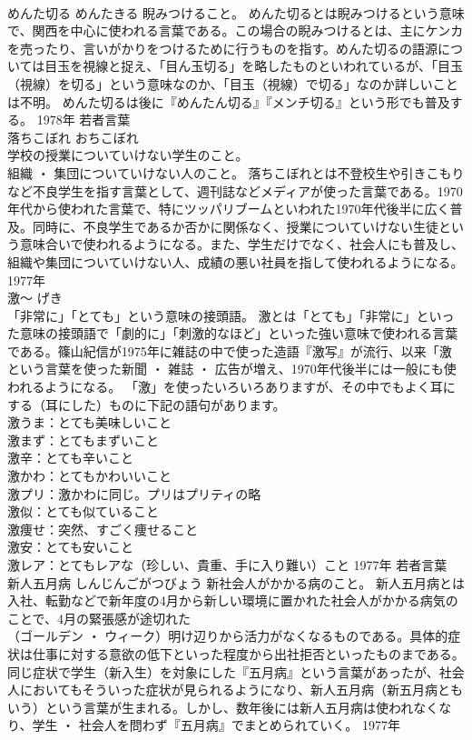 \documentclass[8pt]{extreport}
\begin{document}
\begin{CJK}{UTF8}{min}
\\	めんた切る	めんたきる	睨みつけること。	めんた切るとは睨みつけるという意味で、関西を中心に使われる言葉である。この場合の睨みつけるとは、主にケンカを売ったり、言いがかりをつけるために行うものを指す。めんた切るの語源については目玉を視線と捉え、「目ん玉切る」を略したものといわれているが、「目玉（視線）を切る」という意味なのか、「目玉（視線）で切る」なのか詳しいことは不明。 めんた切るは後に『めんたん切る』『メンチ切る』という形でも普及する。	1978年	若者言葉	
\\	落ちこぼれ	おちこぼれ	
\\	学校の授業についていけない学生のこと。 
\\	組織 ・ 集団についていけない人のこと。	落ちこぼれとは不登校生や引きこもりなど不良学生を指す言葉として、週刊誌などメディアが使った言葉である。1970年代から使われた言葉で、特にツッパリブームといわれた1970年代後半に広く普及。同時に、不良学生であるか否かに関係なく、授業についていけない生徒という意味合いで使われるようになる。また、学生だけでなく、社会人にも普及し、組織や集団についていけない人、成績の悪い社員を指して使われるようになる。	1977年	
\\	激～	げき
\\	「非常に」「とても」という意味の接頭語。	激とは「とても」「非常に」といった意味の接頭語で「劇的に」「刺激的なほど」といった強い意味で使われる言葉である。篠山紀信が1975年に雑誌の中で使った造語『激写』が流行、以来「激
\\	という言葉を使った新聞 ・ 雑誌 ・ 広告が増え、1970年代後半には一般にも使われるようになる。 「激」を使ったいろいろありますが、その中でもよく耳にする（耳にした）ものに下記の語句があります。 
\\	激うま：とても美味しいこと 
\\	激まず：とてもまずいこと 
\\	激辛：とても辛いこと 
\\	激かわ：とてもかわいいこと 
\\	激プリ：激かわに同じ。プリはプリティの略 
\\	激似：とても似ていること 
\\	激痩せ：突然、すごく痩せること 
\\	激安：とても安いこと 
\\	激レア：とてもレアな（珍しい、貴重、手に入り難い）こと	1977年	若者言葉	
\\	新人五月病	しんじんごがつびょう	新社会人がかかる病のこと。	新人五月病とは入社、転勤などで新年度の4月から新しい環境に置かれた社会人がかかる病気のことで、4月の緊張感が途切れた
\\	（ゴールデン ・ ウィーク）明け辺りから活力がなくなるものである。具体的症状は仕事に対する意欲の低下といった程度から出社拒否といったものまである。同じ症状で学生（新入生）を対象にした『五月病』という言葉があったが、社会人においてもそういった症状が見られるようになり、新人五月病（新五月病ともいう）という言葉が生まれる。しかし、数年後には新人五月病は使われなくなり、学生 ・ 社会人を問わず『五月病』でまとめられていく。	1977年	

\end{CJK}
\end{document}
